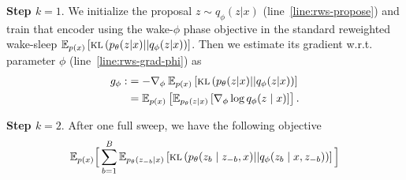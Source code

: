 \documentclass[anonymous=false, %
               format=acmsmall, %
               review=true, %
               screen=true, %
               nonacm=true]{acmart}
\theoremstyle{definition}
\newcommand{\given}{\lvert}
\begin{document}
\textbf{Step $k=1$}. We initialize the proposal $z\sim q_\phi(z \given x)$ (line~\ref{line:rws-propose}) and train that encoder using the wake-$\phi$ phase objective in the standard reweighted wake-sleep\cite{le2019revisiting}
$\E_{p(x)}\left[\textsc{kl}\left(p_\theta(z \given x) || q_\phi(z \given x)\right)\right]$. 
Then we estimate its gradient w.r.t. parameter $\phi$ (line~\ref{line:rws-grad-phi}) as
\begin{align}
    \label{eq:g-rws-phi}
    g_\phi :&= - \nabla_\phi \: \E_{p(x)}\left[\textsc{kl}\left(p_\theta(z \given x) || q_\phi(z \given x)\right)\right] \\
    &
    =
    \E_{p(x)}\left[
    \E_{p_\theta(z \given x)}\left[\nabla_\phi \log q_\phi(z \mid x)\right]
    \right]
    . 
\end{align}

\textbf{Step $k=2$}. After one full sweep, we have the following objective
\begin{align*}
    \mathbb{E}_{p(x)}\Big[
    \sum_{b = 1}^B\mathbb{E}_{p_\theta(z_{-b} \mid x)}\left[\textsc{kl}\left(p_\theta(z_b \mid z_{-b}, x) || q_\phi(z_b \mid x, z_{-b})\right)\right]\Big] 
\end{align*}




\end{document}
